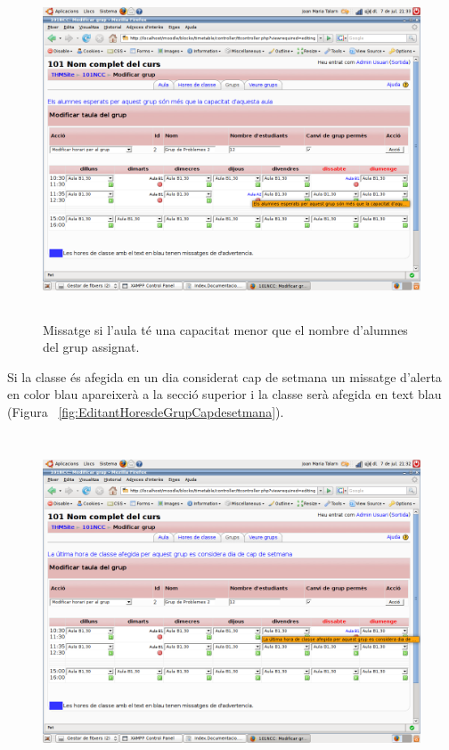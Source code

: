 \documentclass[a4paper]{report}  %
\begin{document}
\begin{itemize}
\begin{itemize}
\begin{figure}[H]
		\begin{center}
		\includegraphics[height=10cm,width=12cm]{img/ModificantHoresGrupAulaPetita.png}
		\caption[List caption]{Missatge si l'aula té una capacitat menor que el nombre d'alumnes del grup assignat.}
		\label{fig:ModificantHoresGrupAulaPetita}
		\end{center}
		\end{figure}
	Si la classe és afegida en un dia considerat cap de setmana un missatge d'alerta en color blau apareixerà a la secció superior i la classe serà afegida en text blau (Figura ~\ref{fig:EditantHoresdeGrupCapdesetmana}).
		\begin{figure}[H] %
		\begin{center}
		\includegraphics[height=10cm,width=12cm]{img/EditantHoresdeGrupCapdesetmana.png}

\end{center}
\end{figure}
\end{itemize}
\end{itemize}
\end{document}
